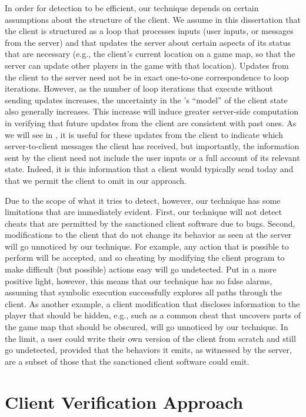 In order for detection to be efficient, our technique depends on
certain assumptions about the structure of the client.  We assume
in this dissertation that the client is structured as a loop that
processes inputs (user inputs, or messages from the server) and
that updates the server about certain aspects of its status that
are necessary (e.g., the client's current
location on a game map, so that the server can update other players in
the game with that location).  Updates from the client to the server
need not be in exact one-to-one correspondence to loop iterations.
However, as the number of loop iterations that execute without sending
updates increases, the uncertainty in the \verifier's ``model'' of the
client state also generally increases.  This increase will induce
greater server-side computation in verifying that future updates from
the client are consistent with past ones.  As we will see in
, it is useful for these updates from the client to
indicate which server-to-client messages the client has received, but
importantly, the information sent by the client need not include the
user inputs or a full account of its relevant state.  Indeed, it is
this information that a client would typically send today and
that we permit the client to omit in our approach.

Due to the scope of what it tries to detect, however, our technique
has some limitations that are immediately evident.  First, our
technique will not detect cheats that are permitted by the sanctioned
client software due to bugs.  Second, modifications to the client
that do not change its behavior as seen at the server will go
unnoticed by our technique.  For example, any action that is possible
to perform will be accepted, and so cheating by
modifying the client program to make difficult (but possible) actions
easy will go undetected.  Put in a more positive light, however, this
means that our technique has no false alarms, assuming that symbolic
execution successfully explores all paths through the client.  As
another example, a client modification that discloses information to
the player that should be hidden, e.g., such as a common cheat that
uncovers parts of the game map that should be obscured, will go
unnoticed by our technique.  In the limit, a user could write their 
own version of the client from scratch and still go undetected,
provided that the behaviors it emits, as witnessed by the server, are
a subset of those that the sanctioned client software could emit.

\section{Client Verification Approach}
\label{sec:scv:exhaustive}
\label{sec:scv:approach}

